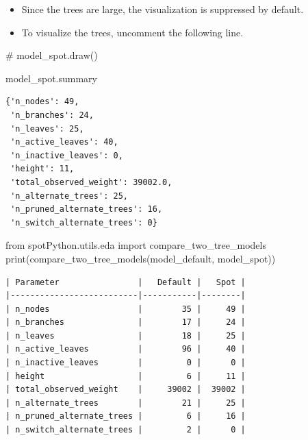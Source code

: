 \documentclass[
  letterpaper,
  DIV=11,
  numbers=noendperiod]{scrreprt}
\newenvironment{Shaded}{\begin{snugshade}}{\end{snugshade}}
\newcommand{\BuiltInTok}[1]{\textcolor[rgb]{0.00,0.23,0.31}{#1}}
\newcommand{\CommentTok}[1]{\textcolor[rgb]{0.37,0.37,0.37}{#1}}
\newcommand{\ImportTok}[1]{\textcolor[rgb]{0.00,0.46,0.62}{#1}}
\newcommand{\NormalTok}[1]{\textcolor[rgb]{0.00,0.23,0.31}{#1}}
\providecommand{\tightlist}{%
  \setlength{\itemsep}{0pt}\setlength{\parskip}{0pt}}\usepackage{longtable,booktabs,array}
\begin{document}
\begin{tcolorbox}[enhanced jigsaw, left=2mm, toprule=.15mm, colframe=quarto-callout-caution-color-frame, leftrule=.75mm, title=\textcolor{quarto-callout-caution-color}{\faFire}\hspace{0.5em}{Caution: Large Trees}, toptitle=1mm, opacitybacktitle=0.6, arc=.35mm, titlerule=0mm, opacityback=0, bottomtitle=1mm, coltitle=black, rightrule=.15mm, colback=white, colbacktitle=quarto-callout-caution-color!10!white, breakable, bottomrule=.15mm]

\begin{itemize}
\tightlist
\item
  Since the trees are large, the visualization is suppressed by default.
\item
  To visualize the trees, uncomment the following line.
\end{itemize}

\end{tcolorbox}

\begin{Shaded}
\begin{Highlighting}[]
\CommentTok{\# model\_spot.draw()}
\end{Highlighting}
\end{Shaded}

\begin{Shaded}
\begin{Highlighting}[]
\NormalTok{model\_spot.summary}
\end{Highlighting}
\end{Shaded}

\begin{verbatim}
{'n_nodes': 49,
 'n_branches': 24,
 'n_leaves': 25,
 'n_active_leaves': 40,
 'n_inactive_leaves': 0,
 'height': 11,
 'total_observed_weight': 39002.0,
 'n_alternate_trees': 25,
 'n_pruned_alternate_trees': 16,
 'n_switch_alternate_trees': 0}
\end{verbatim}

\begin{Shaded}
\begin{Highlighting}[]
\ImportTok{from}\NormalTok{ spotPython.utils.eda }\ImportTok{import}\NormalTok{ compare\_two\_tree\_models}
\BuiltInTok{print}\NormalTok{(compare\_two\_tree\_models(model\_default, model\_spot))}
\end{Highlighting}
\end{Shaded}

\begin{verbatim}
| Parameter                |   Default |   Spot |
|--------------------------|-----------|--------|
| n_nodes                  |        35 |     49 |
| n_branches               |        17 |     24 |
| n_leaves                 |        18 |     25 |
| n_active_leaves          |        96 |     40 |
| n_inactive_leaves        |         0 |      0 |
| height                   |         6 |     11 |
| total_observed_weight    |     39002 |  39002 |
| n_alternate_trees        |        21 |     25 |
| n_pruned_alternate_trees |         6 |     16 |
| n_switch_alternate_trees |         2 |      0 |
\end{verbatim}
\end{document}
